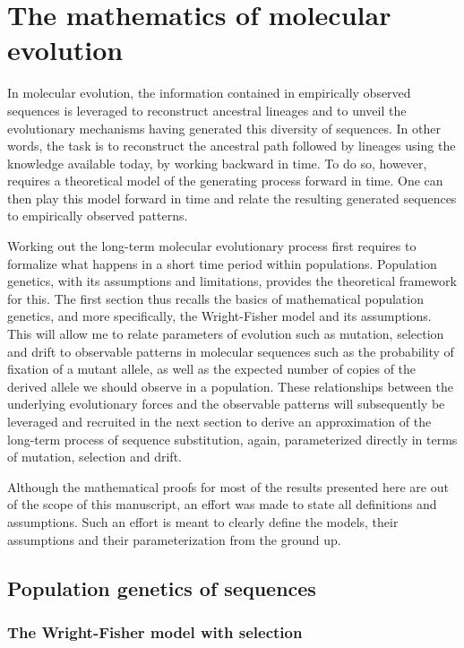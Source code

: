 \thispagestyle{empty}
\chapter{The mathematics of molecular evolution}
{\hypersetup{linkcolor=GREYDARK}\minitoc}
\label{chap:intro-formalism}

In molecular evolution, the information contained in empirically observed sequences is leveraged to reconstruct ancestral lineages and to unveil the evolutionary mechanisms having generated this diversity of sequences.
In other words, the task is to reconstruct the ancestral path followed by lineages using the knowledge available today, by working backward in time.
To do so, however, requires a theoretical model of the generating process forward in time.
One can then play this model forward in time and relate the resulting generated sequences to empirically observed patterns.

Working out the long-term molecular evolutionary process first requires to formalize what happens in a short time period within populations.
Population genetics, with its assumptions and limitations, provides the theoretical framework for this.
The first section thus recalls the basics of mathematical population genetics, and more specifically, the Wright-Fisher model and its assumptions.
This will allow me to relate parameters of evolution such as mutation, selection and drift to observable patterns in molecular sequences such as the probability of fixation of a mutant \gls{allele}, as well as the expected number of copies of the derived \gls{allele} we should observe in a population.
These relationships between the underlying evolutionary forces and the observable patterns will subsequently be leveraged and recruited in the next section to derive an approximation of the long-term process of sequence \gls{substitution}, again, parameterized directly in terms of mutation, selection and drift.

Although the mathematical proofs for most of the results presented here are out of the scope of this manuscript, an effort was made to state all definitions and assumptions.
Such an effort is meant to clearly define the models, their assumptions and their parameterization from the ground up.


\section{Population genetics of sequences}

\subsection{The Wright-Fisher model with selection}

